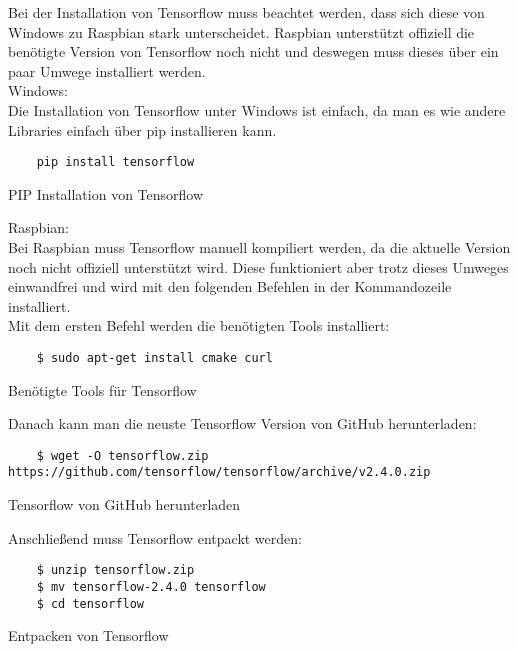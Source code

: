 Bei der Installation von Tensorflow muss beachtet werden, dass sich diese von Windows zu Raspbian stark unterscheidet. 
Raspbian unterstützt offiziell die benötigte Version von Tensorflow noch nicht und deswegen muss dieses über ein paar Umwege installiert werden.\\

Windows:\\

Die Installation von Tensorflow unter Windows ist einfach, da man es wie andere Libraries einfach über pip installieren kann.

\begin{listing}[H]
    \begin{verbatim}
    pip install tensorflow
    \end{verbatim}
    \caption{PIP Installation von Tensorflow}
\end{listing}

Raspbian:\\

Bei Raspbian muss Tensorflow manuell kompiliert werden, da die aktuelle Version noch nicht offiziell unterstützt wird. Diese funktioniert 
aber trotz dieses Umweges einwandfrei und wird mit den folgenden Befehlen in der Kommandozeile installiert.\\

Mit dem ersten Befehl werden die benötigten Tools installiert:

\begin{listing}[H]
    \begin{verbatim}
    $ sudo apt-get install cmake curl
    \end{verbatim}
    \caption{Benötigte Tools für Tensorflow}
\end{listing}

Danach kann man die neuste Tensorflow Version von GitHub herunterladen:

\begin{listing}[H]
    \begin{verbatim}
    $ wget -O tensorflow.zip https://github.com/tensorflow/tensorflow/archive/v2.4.0.zip
    \end{verbatim}
    \caption{Tensorflow von GitHub herunterladen}
\end{listing}

Anschließend muss Tensorflow entpackt werden:

\begin{listing}[H]
    \begin{verbatim}
    $ unzip tensorflow.zip
    $ mv tensorflow-2.4.0 tensorflow
    $ cd tensorflow
    \end{verbatim}
    \caption{Entpacken von Tensorflow}
\end{listing}

